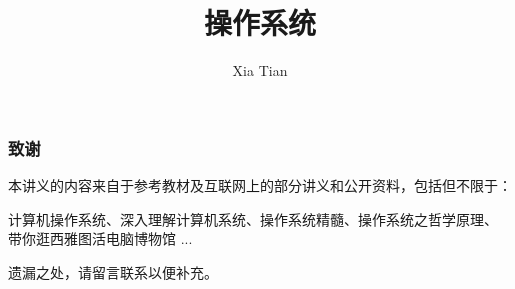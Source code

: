 \documentclass[table, 13pt, slidestop,compress,mathserif]{beamer}
\title{操作系统}
\author{Xia Tian }
\institute{Renmin University of China }
\begin{document}
\frame{\titlepage}

%
%
%

%
% 

\begin{frame}[fragile]
  \frametitle{致谢}

  本讲义的内容来自于参考教材及互联网上的部分讲义和公开资料，包括但不限于：

  计算机操作系统、深入理解计算机系统、操作系统精髓、操作系统之哲学原理、
  带你逛西雅图活电脑博物馆 ...

  遗漏之处，请留言联系以便补充。
\end{frame}
\end{document}
